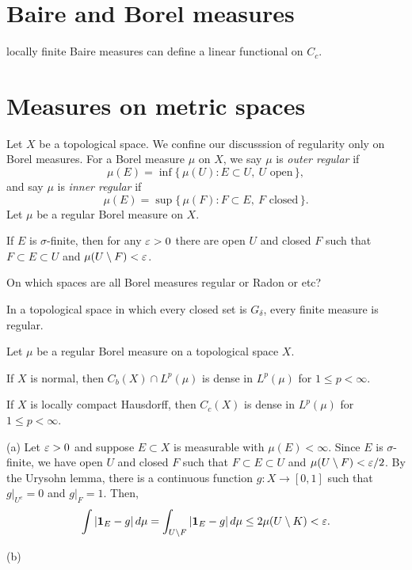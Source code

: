 \documentclass{../../large}
\begin{document}
\section{Baire and Borel measures}
locally finite Baire measures can define a linear functional on $C_c$.


\section{Measures on metric spaces}

\begin{prb}
Let $X$ be a topological space.
We confine our discusssion of regularity only on Borel measures.
For a Borel measure $\mu$ on $X$, we say $\mu$ is \emph{outer regular} if
\[\mu(E)=\inf\{\,\mu(U):E\subset U,\ U\text{ open}\,\},\]
and say $\mu$ is \emph{inner regular} if
\[\mu(E)=\sup\{\,\mu(F):F\subset E,\ F\text{ closed}\,\}.\]
Let $\mu$ be a regular Borel measure on $X$.
\begin{parts}
\item If $E$ is $\sigma$-finite, then for any $\varepsilon>0$ there are open $U$ and closed $F$ such that $F\subset E\subset U$ and $\mu(U\setminus F)<\varepsilon$.
\end{parts}
\end{prb}





\begin{prb}
On which spaces are all Borel measures regular or Radon or etc?

\begin{parts}
\item In a topological space in which every closed set is $G_\delta$, every finite measure is regular.
\end{parts}
\end{prb}





\begin{prb}
Let $\mu$ be a regular Borel measure on a topological space $X$.
\begin{parts}
\item If $X$ is normal, then $C_b(X)\cap L^p(\mu)$ is dense in $L^p(\mu)$ for $1\le p<\infty$.
\item If $X$ is locally compact Hausdorff, then $C_c(X)$ is dense in $L^p(\mu)$ for $1\le p<\infty$.
\end{parts}
\end{prb}
\begin{pf}
(a)
Let $\varepsilon>0$ and suppose $E\subset X$ is measurable with $\mu(E)<\infty$.
Since $E$ is $\sigma$-finite, we have open $U$ and closed $F$ such that $F\subset E\subset U$ and $\mu(U\setminus F)<\varepsilon/2$.
By the Urysohn lemma, there is a continuous function $g:X\to[0,1]$ such that $g|_{U^c}=0$ and $g|_F=1$.
Then,
\[\int|\mathbf{1}_E-g|\,d\mu=\int_{U\setminus F}|\mathbf{1}_E-g|\,d\mu\le2\mu(U\setminus K)<\varepsilon.\]

(b)
\end{pf}
\end{document}
